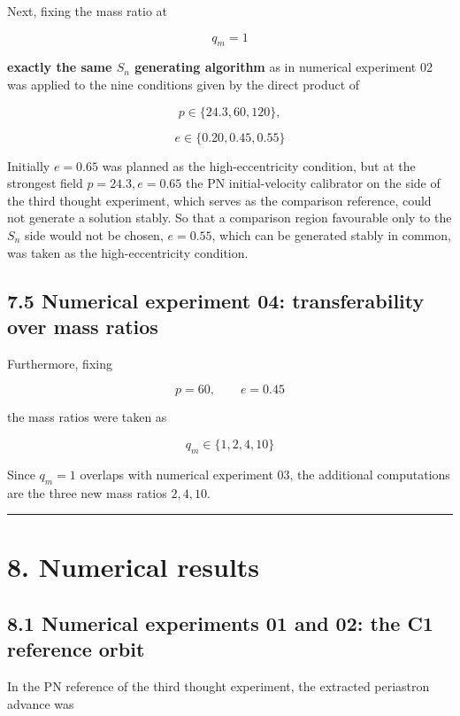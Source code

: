 \documentclass[
  a4paper,
]{article}
\begin{document}
Next, fixing the mass ratio at

\[
q_m=1
\]

\textbf{exactly the same \(S_n\) generating algorithm} as in numerical
experiment 02 was applied to the nine conditions given by the direct
product of

\[
p\in\{24.3,60,120\},
\]

\[
e\in\{0.20,0.45,0.55\}
\]

Initially \(e=0.65\) was planned as the high-eccentricity condition, but
at the strongest field \(p=24.3,e=0.65\) the PN initial-velocity
calibrator on the side of the third thought experiment, which serves as
the comparison reference, could not generate a solution stably. So that
a comparison region favourable only to the \(S_n\) side would not be
chosen, \(e=0.55\), which can be generated stably in common, was taken
as the high-eccentricity condition.

\subsection{7.5 Numerical experiment 04: transferability over mass
ratios}\label{numerical-experiment-04-transferability-over-mass-ratios}

Furthermore, fixing

\[
p=60,
\qquad e=0.45
\]

the mass ratios were taken as

\[
q_m\in\{1,2,4,10\}
\]

Since \(q_m=1\) overlaps with numerical experiment 03, the additional
computations are the three new mass ratios \(2,4,10\).

\begin{center}\rule{0.5\linewidth}{0.5pt}\end{center}

\section{8. Numerical results}\label{numerical-results}

\subsection{8.1 Numerical experiments 01 and 02: the C1 reference
orbit}\label{numerical-experiments-01-and-02-the-c1-reference-orbit}

In the PN reference of the third thought experiment, the extracted
periastron advance was
\end{document}
